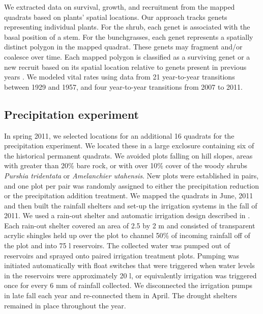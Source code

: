 \documentclass[11pt]{article}
\begin{document}
\begin{doublespacing}
We extracted data on survival, growth, and recruitment from the mapped quadrats based on plants' spatial locations. Our approach tracks genets representing individual plants.  For the shrub, each genet is associated with the basal position of a stem.  For the bunchgrasses, each genet represents a spatially distinct polygon in the mapped quadrat. These genets may fragment and/or coalesce over time. Each mapped polygon is classified as a surviving genet or a new recruit based on its spatial location relative to genets present in previous years \citep{lauenroth_demography_2008}. We modeled vital rates using data from 21 year-to-year transitions between 1929 and 1957, and four year-to-year transitions from 2007 to 2011.  

\subsection*{Precipitation experiment}
In spring 2011, we selected locations for an additional 16 quadrats for the precipitation experiment. We located these in a large exclosure containing six of the historical permanent quadrats.  We avoided plots falling on hill slopes, areas with greater than 20\% bare rock, or with over 10\% cover of the woody shrubs \textit{Purshia tridentata} or \textit{Amelanchier utahensis}. New plots were established in pairs, and one plot per pair was randomly assigned to either the precipitation reduction or the precipitation addition treatment. We mapped the quadrats in June, 2011 and then built the rainfall shelters and set-up the irrigation systems in the fall of 2011. We used a rain-out shelter and automatic irrigation design described in \citep{gherardi, yahdjian_rainout_2002}. Each rain-out shelter covered an area of 2.5 by 2 m and consisted of transparent acrylic shingles held up over the plot to channel 50\% of incoming rainfall off of the plot and into 75 l reservoirs. The collected water was pumped out of reservoirs and sprayed onto paired irrigation treatment plots. Pumping was initiated automatically with float switches that were triggered when water levels in the reservoirs were approximately 20 l, or equivalently irrigation was triggered once for every 6 mm of rainfall collected. We disconnected the irrigation pumps in late fall each year and re-connected them in April.  The drought shelters remained in place throughout the year.  


\end{doublespacing}
\end{document}
